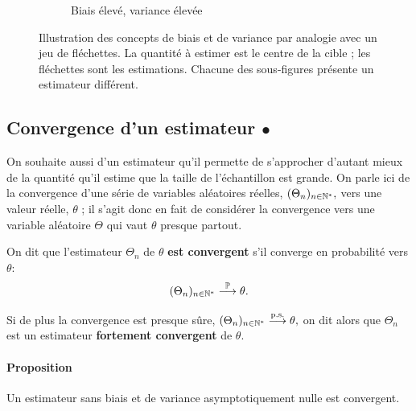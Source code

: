 \begin{figure}[h]
\begin{subfigure}[t]{0.4\textwidth}
    \caption{Biais élevé, variance élevée}
  \end{subfigure}
  \caption{Illustration des concepts de biais et de variance par analogie avec
    un jeu de fléchettes. La quantité à estimer est le centre de la cible ; les
    fléchettes sont les estimations. Chacune des sous-figures présente un
    estimateur différent.}
  \label{fig:flechettes}
\end{figure}


\subsection{Convergence d'un estimateur $\bullet$}
\label{sec:convergence_estimateur}
On souhaite aussi d'un estimateur qu'il permette de s'approcher d'autant mieux
de la quantité qu'il estime que la taille de l'échantillon est grande. On parle
ici de la convergence d'une série de variables aléatoires réelles,
$(\Theta_n)_{n \in \mathbb{N}^*},$ vers une valeur réelle, $\theta$ ; il s'agit donc
en fait de considérer la convergence vers une variable aléatoire $\Theta$ qui
vaut $\theta$ presque partout.

On dit que l'estimateur $\Theta_n$ de $\theta$ \textbf{est convergent} s'il
converge en probabilité vers $\theta:$
\begin{equation}
  \label{eq:estimateur_convergent}
  (\Theta_n)_{n \in \mathbb{N}^*} \stackrel{\mathbb{P}}{\longrightarrow} \theta.
\end{equation}

Si de plus la convergence est presque sûre,
$(\Theta_n)_{n \in \mathbb{N}^*} \stackrel{\text{p.s.}}{\longrightarrow} \theta,$ on dit alors que $\Theta_n$ est un
estimateur \textbf{fortement convergent} de $\theta$.

\paragraph{Proposition} Un estimateur sans biais et de variance
asymptotiquement nulle est convergent.

